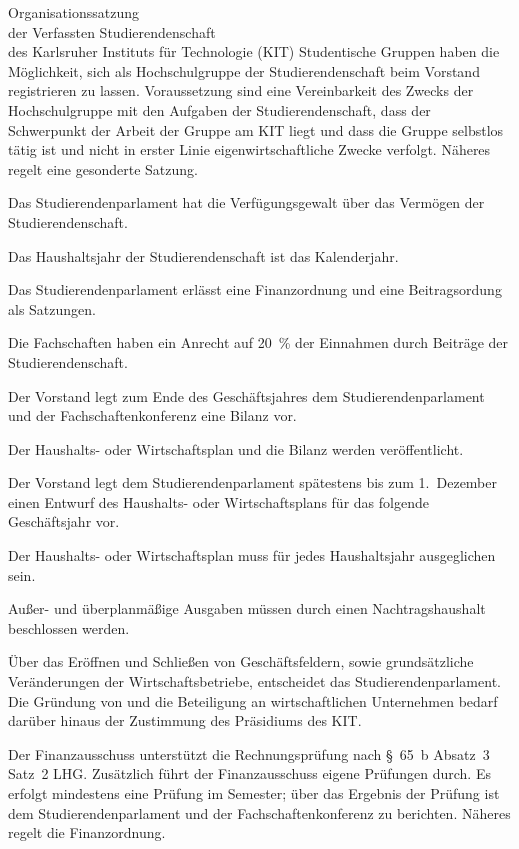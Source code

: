 \begin{jurdoc}[Organisationssatzung]{Organisationssatzung\\der Verfassten Studierendenschaft\\des Karlsruher Instituts für Technologie (KIT)}
Studentische Gruppen haben die Möglichkeit, sich als Hochschulgruppe der Studierendenschaft beim Vorstand registrieren zu lassen. Voraussetzung sind eine Vereinbarkeit des Zwecks der Hochschulgruppe mit den Aufgaben der Studierendenschaft, dass der Schwerpunkt der Arbeit der Gruppe am KIT liegt und dass die Gruppe selbstlos tätig ist und nicht in erster Linie eigenwirtschaftliche Zwecke verfolgt. Näheres regelt eine gesonderte Satzung.

%
%



Das Studierendenparlament hat die Verfügungsgewalt über das Vermögen der Studierendenschaft.

Das Haushaltsjahr der Studierendenschaft ist das Kalenderjahr.

Das Studierendenparlament erlässt eine Finanzordnung und eine Beitragsordung als Satzungen.

Die Fachschaften haben ein Anrecht auf 20~\% der Einnahmen durch Beiträge der Studierendenschaft. \label{haushalt:fachschaftsgelder}

Der Vorstand legt zum Ende des Geschäftsjahres dem Studierendenparlament und der Fachschaftenkonferenz eine Bilanz vor.

Der Haushalts- oder Wirtschaftsplan und die Bilanz werden veröffentlicht.


 \label{haushalt:haushaltsplan}

Der Vorstand legt dem Studierendenparlament spätestens bis zum 1.~Dezember einen Entwurf des Haushalts- oder Wirtschaftsplans für das folgende Geschäftsjahr vor.

Der Haushalts- oder Wirtschaftsplan muss für jedes Haushaltsjahr ausgeglichen sein.

Außer- und überplanmäßige Ausgaben müssen durch einen Nachtragshaushalt beschlossen werden.

Über das Eröffnen und Schließen von Geschäftsfeldern, sowie grundsätzliche Veränderungen der Wirtschaftsbetriebe, entscheidet das Studierendenparlament. Die Gründung von und die Beteiligung an wirtschaftlichen Unternehmen bedarf darüber hinaus der Zustimmung des Präsidiums des KIT.


 \label{haushalt:finanzauschuss}

Der Finanzausschuss unterstützt die Rechnungsprüfung nach §~65~b Absatz~3 Satz~2 LHG. Zusätzlich führt der Finanzausschuss eigene Prüfungen durch. Es erfolgt mindestens eine Prüfung im Semester; über das Ergebnis der Prüfung ist dem Studierendenparlament und der Fachschaftenkonferenz zu berichten. Näheres regelt die Finanzordnung.


\end{jurdoc}
